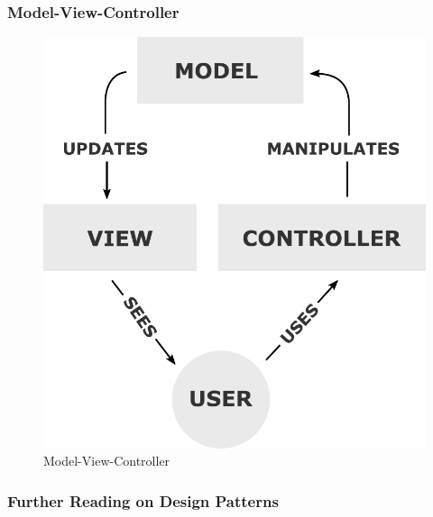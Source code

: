 \documentclass[aspectratio=169]{beamer}
\begin{document}
\begin{frame}
\frametitle{Model-View-Controller}
\begin{figure}
\includegraphics[scale=0.42]{../artifacts/mvc-diagram.pdf}
\caption{Model-View-Controller}
\label{fig:mvc}
\end{figure}
\end{frame}

\begin{frame}
\frametitle{Further Reading on Design Patterns}

\end{frame}
\end{document}
